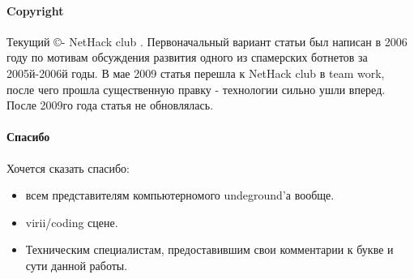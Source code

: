 \paragraph{Copyright\\}

Текущий \copyright - NetHack club .
Первоначальный вариант статьи был написан в 2006 году по мотивам обсуждения развития
одного из спамерских ботнетов за 2005й-2006й годы. В мае 2009 статья перешла к NetHack
club в team work, после чего прошла существенную правку - технологии сильно
ушли вперед. После 2009го года статья не обновлялась.

\paragraph{Спасибо\\}

Хочется сказать спасибо:

\begin{itemize}
\item{всем представителям компьютерномого undeground'а вообще.}
\item{virii/coding сцене.}
\item{Техническим специалистам, предоставившим свои комментарии к букве и сути данной работы.}
\end{itemize}

